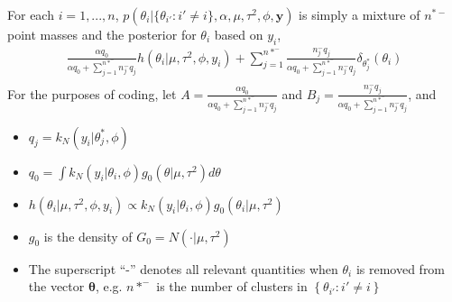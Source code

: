 \documentclass[a4paper, 10pt]{article}
\newcommand{\sumjnminus}{\sum_{j=1}^{n{*}^{-}}}
\newcommand{\kNormal}{k_N(\yi| \thi, \phi)}
\newcommand{\hFn}{h(\thi|\mu,\tausq,\phi, \yi)}
\newcommand{\yi}{y_i}
\newcommand{\startheta}{\theta_j^*}
\newcommand{\thi}{\theta_i}
\newcommand{\ybold}{\pmb{y}}
\newcommand{\tausq}{\tau^2}
\begin{document}
\begin{enumerate}
\begin{enumerate}
        For each $i = 1,...,n$, $p(\thi|\{\theta_{i'}:i'\ne i\},\alpha,\mu, \tausq, \phi, \ybold)$ is simply a mixture of $n^{*-}$ point masses and the posterior for $\thi$ based on $\yi$,
        \begin{align*}
            \frac{\alpha q_0}{\alpha q_0 + \sumjnminus n_j^{-} q_j } \hFn + \sumjnminus \frac{ n_j^{-} q_j }{ \alpha q_0 + \sumjnminus n_j^{-} q_j} \delta_{\startheta}(\thi)\\
        \end{align*}
        For the purposes of coding, let $A = \frac{\alpha q_0}{\alpha q_0 + \sumjnminus n_j^{-} q_j }$ and $B_j = \frac{ n_j^{-} q_j }{ \alpha q_0 + \sumjnminus n_j^{-} q_j}$, and
        \begin{itemize}
            \item $q_j = k_N(\yi|\startheta, \phi)$
            \item $q_0 = \int \kNormal g_0(\theta| \mu, \tausq) d\theta$
            \item $ \hFn \propto \kNormal g_0(\thi|\mu,\tausq)$
            \item $g_0$ is the density of $G_0 = N(\cdot|\mu,\tausq)$
            \item The superscript ``-'' denotes all relevant quantities when $\thi$ is removed from the vector $\pmb{\theta}$, e.g. $n*^{-}$ is the number of clusters in $\left\{\theta_{i'}: i' \ne i \right\}$
        \end{itemize}
        

\end{enumerate}
\end{enumerate}
\end{document}
